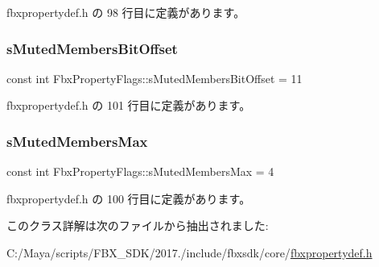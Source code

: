  fbxpropertydef.\+h の 98 行目に定義があります。

\mbox{\label{class_fbx_property_flags_a65028b3fb67cf0516952c23c659b8903}} 
\subsubsection{\texorpdfstring{s\+Muted\+Members\+Bit\+Offset}{sMutedMembersBitOffset}}
{\footnotesize\ttfamily const int Fbx\+Property\+Flags\+::s\+Muted\+Members\+Bit\+Offset = 11\hspace{0.3cm}{\ttfamily [static]}}



 fbxpropertydef.\+h の 101 行目に定義があります。

\mbox{\label{class_fbx_property_flags_a044e37bb3031aa737cf6141d108c77cb}} 
\subsubsection{\texorpdfstring{s\+Muted\+Members\+Max}{sMutedMembersMax}}
{\footnotesize\ttfamily const int Fbx\+Property\+Flags\+::s\+Muted\+Members\+Max = 4\hspace{0.3cm}{\ttfamily [static]}}



 fbxpropertydef.\+h の 100 行目に定義があります。



このクラス詳解は次のファイルから抽出されました\+:\begin{DoxyCompactItemize}
\item 
C\+:/\+Maya/scripts/\+F\+B\+X\+\_\+\+S\+D\+K/2017./include/fbxsdk/core/\hyperlink{fbxpropertydef_8h}{fbxpropertydef.\+h}\end{DoxyCompactItemize}
